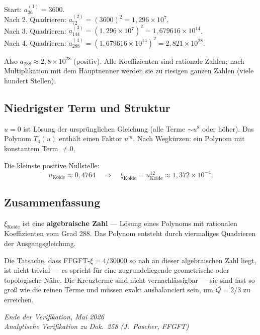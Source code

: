 Start: $a_{36}^{(1)}=3600$.\\
Nach 2. Quadrieren: $a_{72}^{(2)}=(3600)^2=1{,}296\times10^7$.\\
Nach 3. Quadrieren: $a_{144}^{(3)}=(1{,}296\times10^7)^2=1{,}679616\times10^{14}$.\\
Nach 4. Quadrieren: $a_{288}^{(4)}=(1{,}679616\times10^{14})^2=2{,}821\times10^{28}$.

Also $a_{288}\approx2{,}8\times10^{28}$ (positiv).
Alle Koeffizienten sind rationale Zahlen; nach Multiplikation mit dem Hauptnenner
werden sie zu riesigen ganzen Zahlen (viele hundert Stellen).

\subsection{Niedrigster Term und Struktur}

$u=0$ ist Lösung der ursprünglichen Gleichung (alle Terme $\sim u^8$ oder höher).
Das Polynom $T_4(u)$ enthält einen Faktor $u^m$. Nach Wegkürzen:
ein Polynom mit konstantem Term $\neq0$.

Die kleinste positive Nullstelle:
\[
  u_{\text{Koide}}\approx0{,}4764
  \quad\Rightarrow\quad
  \xi_{\text{Koide}}=u_{\text{Koide}}^{12}\approx1{,}372\times10^{-4}.
\]

\subsection{Zusammenfassung}

$\xi_{\text{Koide}}$ ist eine \textbf{algebraische Zahl} — Lösung eines Polynoms
mit rationalen Koeffizienten vom Grad 288.
Das Polynom entsteht durch viermaliges Quadrieren der Ausgangsgleichung.

Die Tatsache, dass FFGFT-$\xi=4/30000$ so nah an dieser algebraischen Zahl liegt,
ist nicht trivial — es spricht für eine zugrundeliegende geometrische
oder topologische Nähe.
Die Kreuzterme sind nicht vernachlässigbar — sie sind fast so groß wie die
reinen Terme und müssen exakt ausbalanciert sein, um $Q=2/3$ zu erreichen.

\bigskip
\begin{flushright}
\textit{Ende der Verifikation, Mai 2026}\\
\textit{Analytische Verifikation zu Dok.~258 (J.~Pascher, FFGFT)}
\end{flushright}
